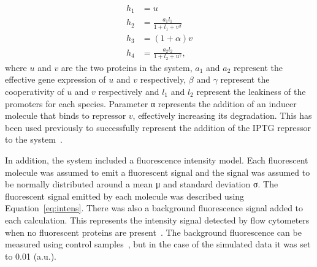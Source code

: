 \begin{align}
h_1 &= u \label{eq:eg1}\\
h_2 &= \frac{a_1  l_1	}{1+l_1+v^{β}} \label{eq:eg2}\\
h_3 &= (1 + α) v \label{eq:eg3}\\
h_4 &= \frac{a_2 l_2}{1+l_2+u^{γ}} \label{eq:eg4},
\end{align}
\noindent where $u$ and $v$ are the two proteins in the system, $a_1$ and $a_2$ represent the effective gene expression of $u$ and $v$ respectively, $β$ and $γ$ represent the cooperativity of $u$ and $v$ respectively and $l_1$ and $l_2$ represent the leakiness of the promoters for each species. Parameter α represents the addition of an inducer molecule that binds to repressor $v$, effectively increasing its degradation. This has been used previously to successfully represent the addition of the IPTG repressor to the system~\autocite{Lillacci:2013hu}.

In addition, the system included a fluorescence intensity model. Each fluorescent molecule was assumed to emit a fluorescent signal and the signal was assumed to be normally distributed around a mean μ and standard deviation σ. The fluorescent signal emitted by each molecule was described using Equation~\ref{eq:intens}. There was also a background fluorescence signal added to each calculation. This represents the intensity signal detected by flow cytometers when no fluorescent proteins are present~\autocite{Lillacci:2013hu}. The background fluorescence can be measured using control samples~\autocite{Lillacci:2013hu}, but in the case of the simulated data it was set to 0.01 (a.u.).  


